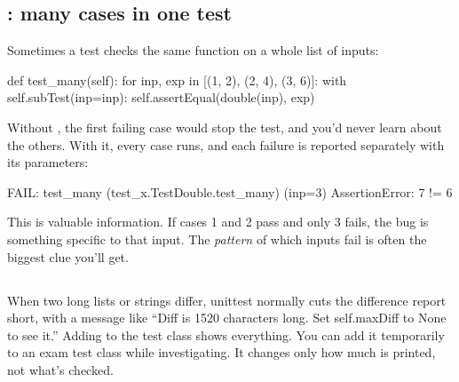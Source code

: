 \documentclass[10pt,a4paper]{article}
\begin{document}
\subsection{: many cases in one test}
Sometimes a test checks the same function on a whole list of inputs:
\begin{pycode}
def test_many(self):
    for inp, exp in [(1, 2), (2, 4), (3, 6)]:
        with self.subTest(inp=inp):
            self.assertEqual(double(inp), exp)
\end{pycode}
Without , the first failing case would stop the test, and you’d never learn about the others. With it, every case runs, and each failure is reported separately with its parameters:
\begin{txtcode}
FAIL: test_many (test_x.TestDouble.test_many) (inp=3)
AssertionError: 7 != 6
\end{txtcode}
This is valuable information. If cases 1 and 2 pass and only 3 fails, the bug is something specific to that input. The \emph{pattern} of which inputs fail is often the biggest clue you’ll get.
\subsection{}
When two long lists or strings differ, unittest normally cuts the difference report short, with a message like “Diff is 1520 characters long. Set self.maxDiff to None to see it.” Adding  to the test class shows everything. You can add it temporarily to an exam test class while investigating. It changes only how much is printed, not what’s checked.
\end{document}
